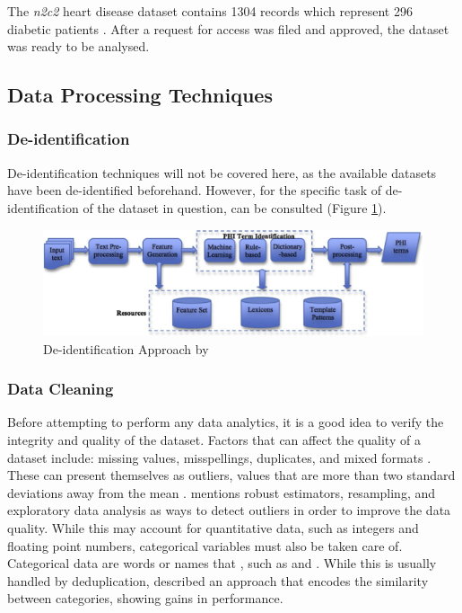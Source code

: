 \documentclass[a4paper,12pt]{article}
\begin{document}
The \textit{n2c2} heart disease dataset contains 1304 records which represent 296
diabetic patients \parencite{Kumar2015}.
After a request for access was filed and approved, the dataset was ready to be
analysed.


\subsection{Data Processing Techniques}

\subsubsection{De-identification}

De-identification techniques will not be covered here,
as the available datasets have been de-identified beforehand.
However, for the specific task of de-identification of the dataset in question,
\textcite{Yang2015} can be consulted (Figure \ref{fig:deid}).

\begin{figure}[h]
\centering
\scriptsize
\includegraphics{deid}
\caption{De-identification Approach by \textcite{Yang2015}}
\label{fig:deid}
\end{figure}

\subsubsection{Data Cleaning}

Before attempting to perform any data analytics, it is a good idea to verify the integrity and quality of the dataset. Factors that can affect the quality of a dataset include: missing values, misspellings, duplicates, and mixed formats \parencite{Chu2016}. These can present themselves as outliers, values that are more than two standard deviations away from the mean \parencite{Hellerstein2008}. \textcite{Hellerstein2008} mentions robust estimators, resampling, and exploratory data analysis as ways to detect outliers in order to improve the data quality. While this may account for quantitative data, such as integers and floating point numbers, categorical variables must also be taken care of. Categorical data are words or names that , such as  and .
While this is usually handled by deduplication, \textcite{Cerda2018} described an approach that encodes the similarity between categories, showing gains in performance.
\end{document}
